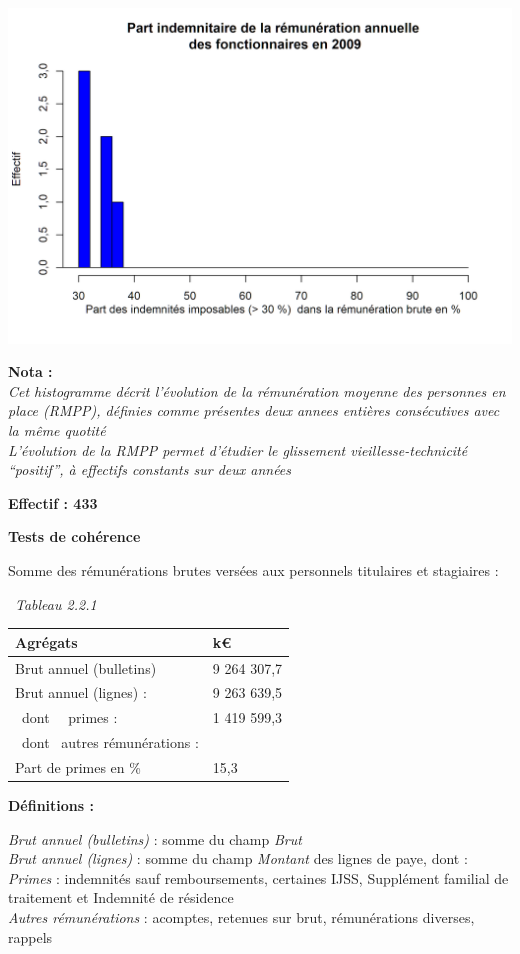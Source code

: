 \includegraphics{altair_files/figure-latex/unnamed-chunk-43-6.png}

\textbf{Nota :}\\
\emph{Cet histogramme décrit l'évolution de la rémunération moyenne des
personnes en place (RMPP), définies comme présentes deux annees entières
consécutives avec la même quotité}\\
\emph{L'évolution de la RMPP permet d'étudier le glissement
vieillesse-technicité ``positif'', à effectifs constants sur deux
années}

\textbf{Effectif : 433 }

\textbf{Tests de cohérence}

Somme des rémunérations brutes versées aux personnels titulaires et
stagiaires :

~\emph{Tableau 2.2.1}

\begin{longtable}[]{@{}ll@{}}
\toprule
Agrégats & k€\tabularnewline
\midrule
\endhead
Brut annuel (bulletins) & 9 264 307,7\tabularnewline
Brut annuel (lignes) : & 9 263 639,5\tabularnewline
~dont ~~primes : & 1 419 599,3\tabularnewline
~dont ~autres rémunérations : &\tabularnewline
Part de primes en \% & 15,3\tabularnewline
\bottomrule
\end{longtable}

\textbf{Définitions :}

\emph{Brut annuel (bulletins)} : somme du champ \emph{Brut}\\
\emph{Brut annuel (lignes)} : somme du champ \emph{Montant} des lignes
de paye, dont :\\
\emph{Primes} : indemnités sauf remboursements, certaines IJSS,
Supplément familial de traitement et Indemnité de résidence\\
\emph{Autres rémunérations} : acomptes, retenues sur brut, rémunérations
diverses, rappels

